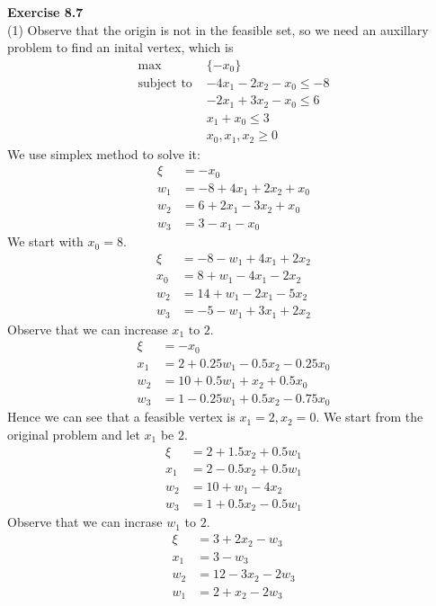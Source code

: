 \documentclass[letterpaper,12pt]{article}
\theoremstyle{definition}
\begin{document}
\noindent\textbf{Exercise 8.7} \\
(1) Observe that the origin is not in the feasible set, so we need an auxillary problem to find an inital vertex, which is
\begin{align*}
  \max &\{ -x_0\} \\
  \text{subject to } & -4x_1 -2x_2 -x_0 \leq -8 \\
  &-2x_1 + 3x_2 -x_0 \leq 6\\
  &x_1 + x_0 \leq 3 \\
  &x_0, x_1, x_2 \geq 0
\end{align*}
We use simplex method to solve it:
\begin{align*}
  \xi &= -x_0 \\
  w_1 &= -8+4x_1 +2x_2 +x_0 \\
  w_2 &= 6 + 2x_1 - 3x_2 + x_0 \\
  w_3 &= 3 - x_1 - x_0
\end{align*}
We start with $x_0 = 8.$
\begin{align*}
  \xi &= -8 - w_1 + 4x_1 + 2x_2 \\
  x_0 &= 8 + w_1 -4x_1 - 2x_2 \\
  w_2 &= 14 + w_1 - 2x_1 - 5x_2 \\
  w_3 &= -5 - w_1 + 3x_1 + 2x_2
\end{align*}
Observe that we can increase $x_1 \text{ to } 2.$
\begin{align*}
  \xi &= -x_0 \\
  x_1 &= 2 + 0.25 w_1 - 0.5 x_2 - 0.25 x_0 \\
  w_2 &= 10 + 0.5w_1 + x_2 + 0.5x_0\\
  w_3 &= 1 - 0.25 w_1 + 0.5x_2 -0.75x_0
\end{align*}
Hence we can see that a feasible vertex is $x_1 = 2, x_2 = 0.$ We start from the original problem and let $x_1$ be $2$.
\begin{align*}
  \xi &= 2 + 1.5x_2 + 0.5 w_1\\
  x_1 &= 2 - 0.5x_2 + 0.5w_1 \\
  w_2 &= 10 + w_1 - 4x_2 \\
  w_3 &= 1 + 0.5 x_2 - 0.5w_1
\end{align*}
Observe that we can incrase $w_1$ to $2.$
\begin{align*}
  \xi &= 3 + 2 x_2 - w_3 \\
  x_1 &= 3 - w_3 \\
  w_2 &= 12 - 3x_2 - 2w_3 \\
  w_1 &= 2 + x_2 -2w_3
\end{align*}
\end{document}
